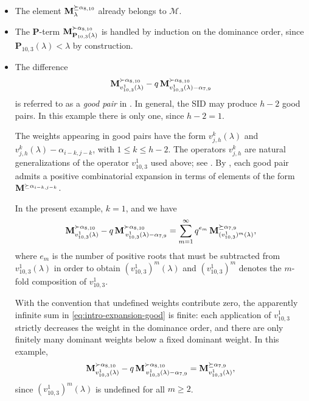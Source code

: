 \begin{itemize}
    \item The element $\mathbf{M}_{\lambda}^{\succeq\alpha_{8,10}}$ already belongs to $\mathcal{M}$.

    \item The $\mathbf{P}$-term $\mathbf{M}_{\mathbf{P}_{10,3}(\lambda)}^{\succ \alpha_{8,10}}$ is handled by induction on the dominance order, since $\mathbf{P}_{10,3}(\lambda)<\lambda$ by construction.

    \item The difference
    \[
        \mathbf{M}_{v_{10,3}^1(\lambda)}^{\succ \alpha_{8,10}}
        -q\,\mathbf{M}_{v_{10,3}^1(\lambda)-\alpha_{7,9}}^{\succ \alpha_{8,10}}
    \]
    is referred to as a \emph{good pair} in .
    In general, the SID may produce $h-2$ good pairs. In this example there is only one, since $h-2=1$.

    The weights appearing in good pairs have the form $v_{j,h}^k(\lambda)$ and $v_{j,h}^k(\lambda)-\alpha_{i-k,j-k}$, with $1\leq k\leq h-2$. The operators $v_{j,h}^k$ are natural generalizations of the operator $v_{10,3}^1$ used above; see . By , each good pair admits a positive combinatorial expansion in terms of elements of the form $\mathbf{M}^{\succeq\alpha_{i-k,j-k}}$.

    In the present example, $k=1$, and we have
    \begin{equation} \label{eq:intro-expansion-good}
    \mathbf{M}_{v_{10,3}^1(\lambda)}^{\succ \alpha_{8,10}} 
    - q\, \mathbf{M}_{\,v_{10,3}^1(\lambda)-\alpha_{7,9}}^{\succ \alpha_{8,10}}
    = 
    \sum_{m=1}^{\infty} q^{e_m}\,
    \mathbf{M}_{(v^1_{10,3})^{m} (\lambda)}^{\succeq \alpha_{7,9}},
\end{equation}
where $e_m$ is the number of positive roots that must be subtracted from $v^1_{10,3}(\lambda)$ in order to obtain $(v^1_{10,3})^m(\lambda)$ and $(v_{10,3}^{1})^m$ denotes the $m$-fold composition of $v_{10,3}^1$.

With the convention that undefined weights contribute zero, the apparently infinite sum in \eqref{eq:intro-expansion-good} is finite: each application of $v^1_{10,3}$ strictly decreases the weight in the dominance order, and there are only finitely many dominant weights below a fixed dominant weight. In this example,
\begin{equation} \label{eq:intro-expansion-good-concrete}
    \mathbf{M}_{v_{10,3}^1(\lambda)}^{\succ \alpha_{8,10}} 
    - q\, \mathbf{M}_{\,v_{10,3}^1(\lambda)-\alpha_{7,9}}^{\succ \alpha_{8,10}}
    = 
    \mathbf{M}_{v^1_{10,3}(\lambda)}^{\succeq \alpha_{7,9}},
\end{equation}
since $(v_{10,3}^1)^m(\lambda)$ is undefined for all $m\geq 2$.


\end{itemize}
